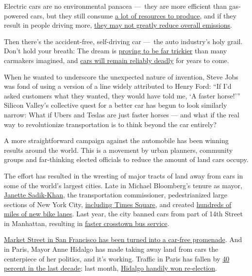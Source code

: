 Electric cars are no environmental panacea ---~they are more efficient
than gas-powered cars, but they still consume
\href{https://www.latimes.com/business/la-fi-electric-car-cobalt-battery-20180222-story.html}{a
lot of resources to produce}, and if they result in people driving more,
\href{https://www.bloomberg.com/news/articles/2019-09-23/electric-vehicles-alone-won-t-stop-climate-change}{they
may not greatly reduce overall emissions}.

Then there's the accident-free, self-driving car ---~the auto industry's
holy grail. Don't hold your breath: The dream is
\href{https://www.investors.com/news/self-driving-cars-hit-delays-driverless-cars-timeline/}{proving
to be far trickier} than many carmakers imagined, and
\href{https://www.nytimes.com/interactive/2019/10/04/opinion/self-driving-cars-safety.html}{cars
will remain reliably deadly} for years to come.

When he wanted to underscore the unexpected nature of invention, Steve
Jobs was fond of using a version of a line widely attributed to Henry
Ford: ``If I'd asked customers what they wanted, they would have told
me, `A faster horse!''' Silicon Valley's collective quest for a better
car has begun to look similarly narrow: What if Ubers and Teslas are
just faster horses --- and what if the real way to revolutionize
transportation is to think beyond the car entirely?

A more straightforward campaign against the automobile has been winning
results around the world. This is a movement by urban planners,
community groups and far-thinking elected officials to reduce the amount
of land cars occupy.

The effort has resulted in the wresting of major tracts of land away
from cars in some of the world's largest cities. Late in Michael
Bloomberg's tenure as mayor, \href{http://www.jsadikkhan.com/}{Janette
Sadik-Khan}, the transportation commissioner, pedestrianized large
sections of New York City,
\href{https://ny.curbed.com/2017/4/19/15358234/times-square-snohetta-before-after-photos}{including
Times Square}, and created
\href{https://www.bicycling.com/news/a20006501/this-woman-built-400-miles-of-bike-lanes-in-new-york-city/}{hundreds
of miles of new bike lanes}. Last year, the city banned cars from part
of 14th Street in Manhattan, resulting in
\href{https://www.ny1.com/nyc/all-boroughs/news/2019/10/18/14th-street-busway-is-making-trips-faster--encouraging-more-trips}{faster
crosstown bus service}.

\href{https://www.sfchronicle.com/bayarea/article/Car-free-Market-What-happens-to-the-side-14999923.php}{Market
Street in San Francisco has been turned into a car-free promenade}. And
in Paris, Mayor Anne Hidalgo has made taking away land from cars the
centerpiece of her politics, and it's working. Traffic in Paris has
fallen by
\href{https://www.bloomberg.com/news/articles/2018-01-19/how-paris-shifted-away-from-the-car}{40
percent in the last decade}; last month,
\href{https://www.newstatesman.com/world/europe/2020/06/how-anne-hidalgos-anti-car-policies-won-her-re-election-paris}{Hidalgo
handily won re-election}.


